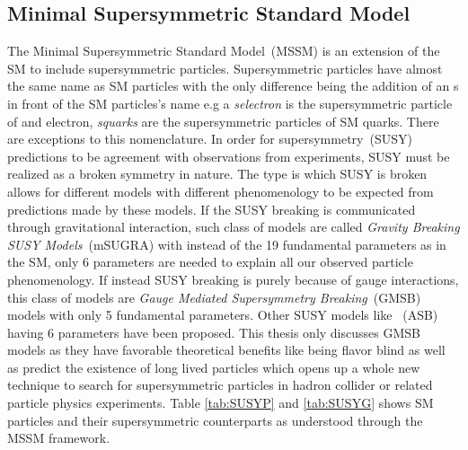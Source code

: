 \subsection{Minimal Supersymmetric Standard Model}
The Minimal Supersymmetric Standard Model~(MSSM) is an extension of the SM to include supersymmetric particles. Supersymmetric particles have almost the same name as SM particles with the only difference being the addition of an s in front of the SM particles's name e.g a \textit{selectron} is the supersymmetric particle of and electron, \textit{squarks} are the supersymmetric particles of SM quarks. There are exceptions to this nomenclature. In order for supersymmetry~(SUSY) predictions to be agreement with observations from experiments, SUSY must be realized as a broken symmetry in nature.
The type is which SUSY is broken allows for different models with different phenomenology to be expected from predictions made by these models. If the SUSY breaking is communicated through gravitational interaction, such class of models are called \textit{Gravity Breaking SUSY Models}~(mSUGRA) with instead of the 19 fundamental parameters as in the SM, only 6 parameters are needed to explain all our observed particle phenomenology. If instead SUSY breaking is purely  because of gauge interactions, this class of models are \textit{Gauge Mediated Supersymmetry Breaking}~(GMSB) models with only 5 fundamental parameters. Other SUSY models like ~(ASB) having 6 parameters have been proposed.
\newline
This thesis only discusses GMSB models as they have favorable theoretical benefits like being flavor blind as well as predict the existence of long lived particles which opens up a whole new technique to search for supersymmetric particles in hadron collider or related particle physics experiments.
Table \ref{tab:SUSYP} and \ref{tab:SUSYG} shows SM particles and their supersymmetric counterparts as understood through the MSSM framework.
